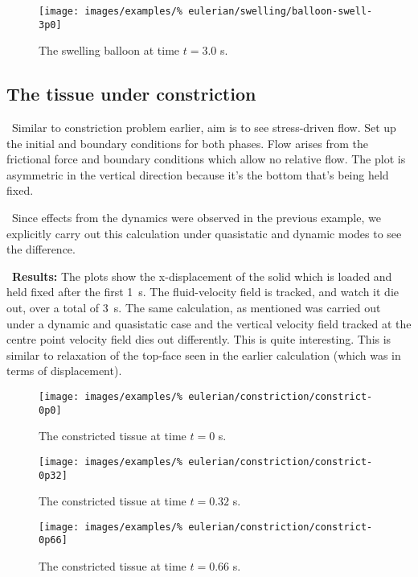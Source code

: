 \begin{figure}[!hptb]
\centering
\texttt{[image: images/examples/\%
eulerian/swelling/balloon-swell-3p0]}
\caption{The swelling balloon at time $t=3.0$ s.} 
\label{swelling-balloon-image-3p0}
\end{figure}

\clearpage

\subsection{The tissue under constriction}
\label{constriction-2}

\textbullet\ Similar to constriction
problem earlier, aim is to see stress-driven flow. Set up the initial
and boundary conditions for both phases.  Flow arises from the
frictional force and boundary conditions which allow no relative
flow. The plot is asymmetric in the vertical direction because it's
the bottom that's being held fixed.

\textbullet\ Since effects from the dynamics were observed in the
previous example, we explicitly carry out this calculation under
quasistatic and dynamic modes to see the difference.

\textbullet\ {\bf Results:} The plots show the x-displacement of the
solid which is loaded and held fixed after the first 1~s. The
fluid-velocity field is tracked, and watch it die out, over a total of
3~s. The same calculation, as mentioned was carried out under a
dynamic and quasistatic case and the vertical velocity field tracked
at the centre point velocity field dies out differently. This is quite
interesting. This is similar to relaxation of the top-face seen in the
earlier calculation (which was in terms of displacement).

\begin{figure}[!hptb]
\centering
\texttt{[image: images/examples/\%
eulerian/constriction/constrict-0p0]}
\caption{The constricted tissue at time $t=0$ s.} 
\label{constrict-image-0p0}
\end{figure}

\begin{figure}[!hptb]
\centering
\texttt{[image: images/examples/\%
eulerian/constriction/constrict-0p32]}
\caption{The constricted tissue at time $t=0.32$ s.} 
\label{constrict-image-0p32}
\end{figure}

\begin{figure}[!hptb]
\centering
\texttt{[image: images/examples/\%
eulerian/constriction/constrict-0p66]}
\caption{The constricted tissue at time $t=0.66$ s.} 
\label{constrict-image-0p66}
\end{figure}

